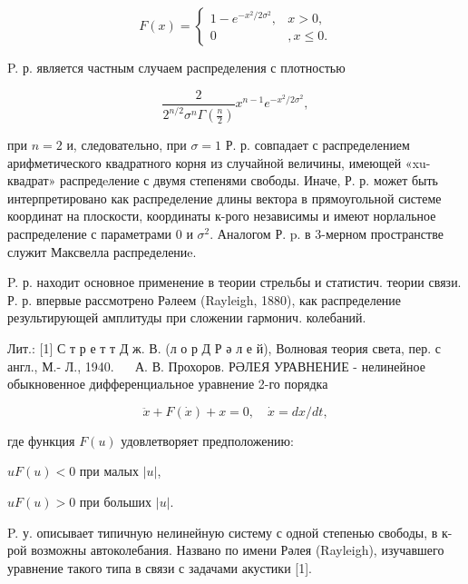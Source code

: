 \documentclass[10pt]{article}
\begin{document}
\[

F(x)= \begin{cases}1-e^{-x^{2} / 2 \sigma^{2}}, & x>0, \\ 0 & , x \leqslant 0 .\end{cases}

\]



P. р. является частным случаем распределения с плотностью



\[

\frac{2}{2^{n / 2} \sigma^{n} \Gamma\left(\frac{n}{2}\right)} x^{n-1} e^{-x^{2} / 2 \sigma^{2}},

\]



при $n=2$ и, следовательно, при $\sigma=1$ Р. р. совпадает с распределением арифметического квадратного корня из случайной величины, имеющей «xu-квадрат» распредeление с двумя степенями свободы. Иначе, Р. р. может быть интерпретировано как распределение длины вектора в прямоугольной системе координат на плоскости, координаты к-рого независимы и имеют норлальное распределение с параметрами 0 и $\sigma^{2}$. Аналогом Р. p. в 3-мерном пространстве служит Максвелла распределениe.



P. р. находит основное применение в теории стрельбы и статистич. теории связи. Р. р. впервые рассмотрено Рәлеем (Rayleigh, 1880), как распределение результирующей амплитуды при сложении гармонич. колебаний.



Лит.: [1] С т р е т т Д ж. В. (л о р Д Р ә л е й), Волновая теория света, пер. с англ., М.- Л., 1940. $\quad$ А. В. Прохоров. РӘЛЕЯ УРАВНЕНИЕ - нелинейное обыкновенное дифференциальное уравнение 2-го порядка



\[

\ddot{x}+F(\dot{x})+x=0, \quad \dot{x}=d x / d t,

\]



где функция $F(u)$ удовлетворяет предположению:



$u F(u)<0$ при малых $|u|$,



$u F(u)>0$ при больших $|u|$.



P. у. описывает типичную нелинейную систему с одной степенью свободы, в к-рой возможны автоколебания. Названо по имени Рәлея (Rayleigh), изучавшего уравнение такого типа в связи с задачами акустики [1].
\end{document}
